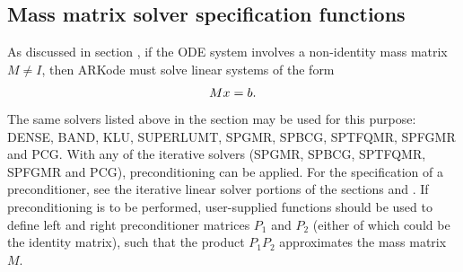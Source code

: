 \documentclass[letterpaper,10pt,english]{sphinxmanual}
\begin{document}
\subsection{Mass matrix solver specification functions}
\label{c_interface/User_callable:cinterface-massmatrixsolvers}\label{c_interface/User_callable:mass-matrix-solver-specification-functions}
As discussed in section {\hyperref[Mathematics:mathematics-masssolve]{\emph{}}}, if the ODE
system involves a non-identity mass matrix \(M\ne I\), then ARKode
must solve linear systems of the form
\begin{gather}
\begin{split}M x = b.\end{split}\notag
\end{gather}
The same solvers listed above in the section
{\hyperref[c_interface/User_callable:cinterface-linearsolvers]{\emph{}}} may be used for this purpose:
DENSE, BAND, KLU, SUPERLUMT, SPGMR, SPBCG, SPTFQMR, SPFGMR and PCG.
With any of the iterative solvers (SPGMR, SPBCG, SPTFQMR, SPFGMR and PCG),
preconditioning can be applied.  For the specification of a
preconditioner, see the iterative linear solver portions of the sections
{\hyperref[c_interface/User_callable:cinterface-optionalinputs]{\emph{}}} and {\hyperref[c_interface/User_supplied:cinterface-usersupplied]{\emph{}}}.
If preconditioning is to be performed, user-supplied functions should
be used to define left and right preconditioner matrices \(P_1\) and
\(P_2\) (either of which could be the identity matrix), such that
the product \(P_{1}P_{2}\) approximates the mass matrix \(M\).
\end{document}
